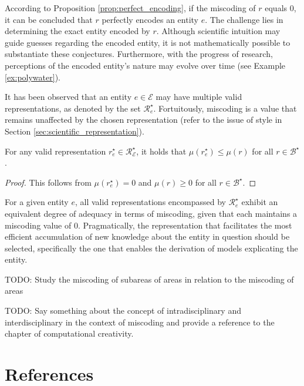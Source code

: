 {According to Proposition \ref{prop:perfect_encoding}, if the miscoding of $r$ equals 0, it can be concluded that $r$ perfectly encodes an entity $e$. The challenge lies in determining the exact entity encoded by $r$. Although scientific intuition may guide guesses regarding the encoded entity, it is not mathematically possible to substantiate these conjectures. Furthermore, with the progress of research, perceptions of the encoded entity's nature may evolve over time (see Example \ref{ex:polywater}).

It has been observed that an entity $e \in \mathcal{E}$ may have multiple valid representations, as denoted by the set $\mathcal{R}^\star_e$. Fortuitously, miscoding is a value that remains unaffected by the chosen representation (refer to the issue of style in Section \ref{sec:scientific_representation}).

\begin{proposition}
For any valid representation $r^\star_e \in \mathcal{R}^\star_\mathcal{E}$, it holds that $\mu\left( r^\star_e \right) \leq \mu\left( r \right)$ for all $r \in \mathcal{B}^\star$.
\end{proposition}
\begin{proof}
This follows from $\mu\left( r^\star_e \right) = 0$ and $\mu\left( r \right) \geq 0$ for all $r \in \mathcal{B}^\star$.
\end{proof}

For a given entity $e$, all valid representations encompassed by $\mathcal{R}^\star_e$ exhibit an equivalent degree of adequacy in terms of miscoding, given that each maintains a miscoding value of $0$. Pragmatically, the representation that facilitates the most efficient accumulation of new knowledge about the entity in question should be selected, specifically the one that enables the derivation of models explicating the entity.

}

{\color{red} TODO: Study the miscoding of subareas of areas in relation to the miscoding of areas}

{\color{red} TODO: Say something about the concept of intradisciplinary and interdisciplinary in the context of miscoding and provide a reference to the chapter of computational creativity.}

%
%

\section*{References}

